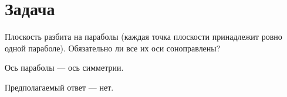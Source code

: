 \section{Задача}
Плоскость разбита на параболы (каждая точка плоскости принадлежит ровно одной параболе). Обязательно ли все их оси соноправлены?

Ось параболы --- ось симметрии.

Предполагаемый ответ --- нет.
